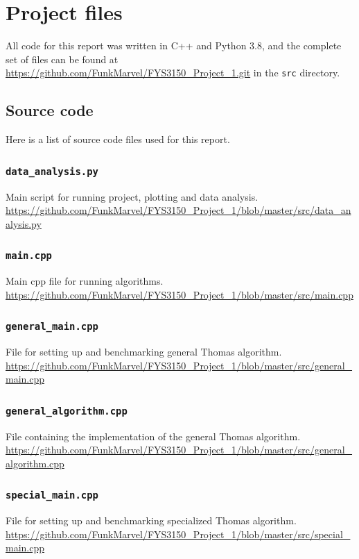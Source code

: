 \documentclass[english,notitlepage,reprint,nofootinbib]{revtex4-1}  %
\begin{document}
{}

\appendix
\section{Project files} \label{A}
All code for this report was written in C++ and Python 3.8, and the complete set of files can be found at \url{https://github.com/FunkMarvel/FYS3150_Project_1.git} in the \verb+src+ directory.

\subsection{Source code} \label{A.1}
Here is a list of source code files used for this report.

\cprotect\subsubsection{\verb+data_analysis.py+} \label{A.1.a}
Main script for running project, plotting and data analysis.
\url{https://github.com/FunkMarvel/FYS3150_Project_1/blob/master/src/data_analysis.py}

\cprotect\subsubsection{\verb+main.cpp+} \label{A.1.b}
Main cpp file for running algorithms.
\url{https://github.com/FunkMarvel/FYS3150_Project_1/blob/master/src/main.cpp}

\cprotect\subsubsection{\verb+general_main.cpp+} \label{A.1.c}
File for setting up and benchmarking general Thomas algorithm.
\url{https://github.com/FunkMarvel/FYS3150_Project_1/blob/master/src/general_main.cpp}

\cprotect\subsubsection{\verb+general_algorithm.cpp+} \label{A.1.d}
File containing the implementation of the general Thomas algorithm.
\url{https://github.com/FunkMarvel/FYS3150_Project_1/blob/master/src/general_algorithm.cpp}

\cprotect\subsubsection{\verb+special_main.cpp+} \label{A.1.e}
File for setting up and benchmarking specialized Thomas algorithm.
\url{https://github.com/FunkMarvel/FYS3150_Project_1/blob/master/src/special_main.cpp}
\end{document}
